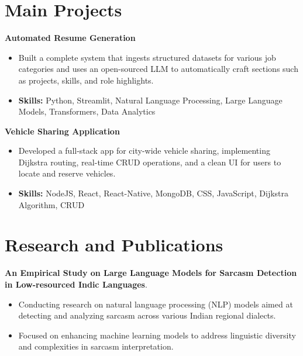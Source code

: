 \documentclass[a4paper,11pt]{article}
\begin{document}
\section{\textbf{Main Projects}}

\vspace{1mm}
  \textbf{Automated Resume Generation  }
\vspace{-1.5mm} %
\begin{itemize}
  \item Built a complete system that ingests structured datasets for various job categories and uses an open-sourced LLM to automatically craft sections such as projects, skills, and role highlights.
\vspace{-3mm}
  \item \textbf{Skills:} Python, Streamlit, Natural Language Processing, Large Language Models, Transformers, Data Analytics
\end{itemize}


\vspace{1mm}
   \textbf{Vehicle Sharing Application }
\vspace{-1.5mm} %
\begin{itemize}
  \item Developed a full-stack app for city-wide vehicle sharing, implementing Dijkstra routing, real-time CRUD operations, and a clean UI for users to locate and reserve vehicles.
\vspace{-3mm}
  \item \textbf{Skills:} NodeJS, React, React-Native, MongoDB, CSS, JavaScript, Dijkstra Algorithm, CRUD
\end{itemize}



\section{\textbf{Research and Publications} \hfill }
\vspace{1mm}
  \textbf{An Empirical Study on Large Language Models for Sarcasm Detection in Low-resourced Indic Languages}.
\vspace{-1mm} %
\begin{itemize}
  \item Conducting research on natural language processing (NLP) models aimed at detecting and analyzing sarcasm across various Indian regional dialects.
\vspace{-3mm}
  \item Focused on enhancing machine learning models to address linguistic diversity and complexities in sarcasm interpretation.
\end{itemize}
\end{document}
